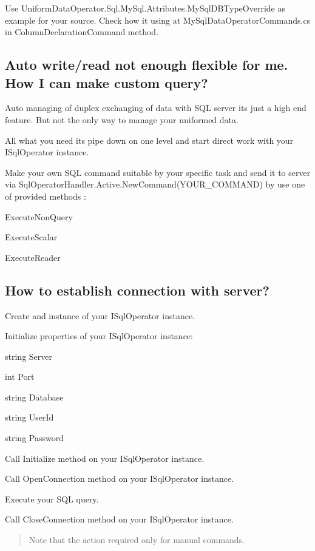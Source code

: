 Use {\ttfamily Uniform\+Data\+Operator.\+Sql.\+My\+Sql.\+Attributes.\+My\+Sql\+D\+B\+Type\+Override} as example for your source. Check how it using at {\ttfamily My\+Sql\+Data\+Operator\+Commands.\+cs} in {\ttfamily Column\+Declaration\+Command} method.

\subsection*{Auto write/read not enough flexible for me. How I can make custom query?}

Auto managing of duplex exchanging of data with S\+QL server it\textquotesingle{}s just a high end feature. But not the only way to manage your uniformed data.

All what you need it\textquotesingle{}s pipe down on one level and start direct work with your {\ttfamily I\+Sql\+Operator} instance.

Make your own S\+QL command suitable by your specific task and send it to server via {\ttfamily Sql\+Operator\+Handler.\+Active.\+New\+Command(\+Y\+O\+U\+R\+\_\+\+C\+O\+M\+M\+A\+N\+D)} by use one of provided methods \+:
\begin{DoxyItemize}
\item {\ttfamily Execute\+Non\+Query}
\item {\ttfamily Execute\+Scalar}
\item {\ttfamily Execute\+Reader}
\end{DoxyItemize}

\subsection*{How to establish connection with server?}


\begin{DoxyEnumerate}
\item Create and instance of your {\ttfamily I\+Sql\+Operator} instance.
\item Initialize properties of your {\ttfamily I\+Sql\+Operator} instance\+:
\begin{DoxyItemize}
\item {\ttfamily string Server}
\item {\ttfamily int Port}
\item {\ttfamily string Database}
\item {\ttfamily string User\+Id}
\item {\ttfamily string Password}
\end{DoxyItemize}
\item Call {\ttfamily Initialize} method on your {\ttfamily I\+Sql\+Operator} instance.
\item Call {\ttfamily Open\+Connection} method on your {\ttfamily I\+Sql\+Operator} instance.
\item Execute your S\+QL query.
\item Call {\ttfamily Close\+Connection} method on your {\ttfamily I\+Sql\+Operator} instance.
\end{DoxyEnumerate}

\begin{quote}
Note that the action required only for manual commands. \end{quote}
